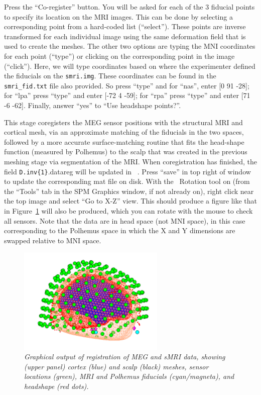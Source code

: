 Press the ``Co-register'' button. You will be asked for each of the 3 fiducial points to specify its location on the MRI images. This can be done by selecting a corresponding point from a hard-coded list (``select''). These points are inverse transformed for each individual image using the same deformation field that is used to create the meshes. The other two options are typing the MNI coordinates for each point (``type'') or clicking on the corresponding point in the image (``click''). Here, we will type coordinates based on where the experimenter defined the fiducials on the \texttt{smri.img}. These coordinates can be found in the \texttt{smri\_fid.txt} file also provided. So press ``type'' and for ``nas'', enter [0  91  -28]; for ``lpa'' press ``type'' and enter [-72   4  -59]; for ``rpa'' press ``type'' and enter [71  -6  -62]. Finally, answer ``yes'' to ``Use headshape points?''.

This stage coregisters the MEG sensor positions with the structural MRI and cortical mesh, via an approximate matching of the fiducials in the two spaces, followed by a more accurate surface-matching routine that fits the head-shape function (measured by Polhemus) to the scalp that was created in the previous meshing stage via segmentation of the MRI. When coregistration has finished, the field \texttt{D.inv\{1\}}.datareg will be updated in \matlab\ . Press ``save'' in top right of window to update the corresponding mat file on disk. With the \matlab\ Rotation tool on (from the ``Tools'' tab in the SPM Graphics window, if not already on), right click near the top image and select ``Go to X-Z'' view. This should produce a figure like that in Figure~\ref{multimodal:fig:17} will also be produced, which you can rotate with the mouse to check all sensors. Note that the data are in head space (not MNI space), in this case corresponding to the Polhemus space in which the X and Y dimensions are swapped relative to MNI space.

\begin{figure}
\begin{center}
\includegraphics[width=70mm]{multimodal/figures/meg_coreg.png}
\caption{\em  Graphical output of registration of MEG and sMRI data, showing (upper panel) cortex (blue) and scalp (black) meshes, sensor locations (green), MRI and Polhemus fiducials (cyan/magneta), and headshape (red dots).\label{multimodal:fig:17}}
\end{center}
\end{figure}


